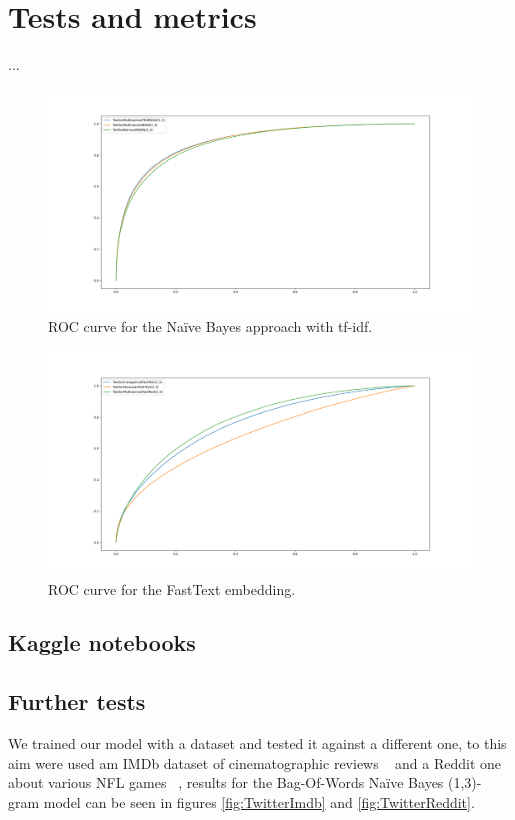 \section*{Tests and metrics}

...

\begin{figure}[h!t]
    \centering
    \includegraphics[scale=0.25]{../experiments/plots/TwitterBOWTfidf}
    \caption{ROC curve for the Na\"ive Bayes approach with tf-idf.}
    \label{fig:ROCNB}        
\end{figure}

\begin{figure}[h!t]
    \centering
    \includegraphics[scale=0.25]{../experiments/plots/TwitterFastText}
    \caption{ROC curve for the FastText embedding.}
    \label{fig:ROCFT}
\end{figure}

\subsection*{Kaggle notebooks}

\subsection*{Further tests}
We trained our model with a dataset and tested it against a different one, to this aim were used am IMDb dataset of cinematographic reviews ~\cite{data:imdb} and a Reddit one about various NFL games ~\cite{data:reddit}, results for the Bag-Of-Words Na\"ive Bayes (1,3)-gram model can be seen in figures \ref{fig:TwitterImdb} and \ref{fig:TwitterReddit}.

